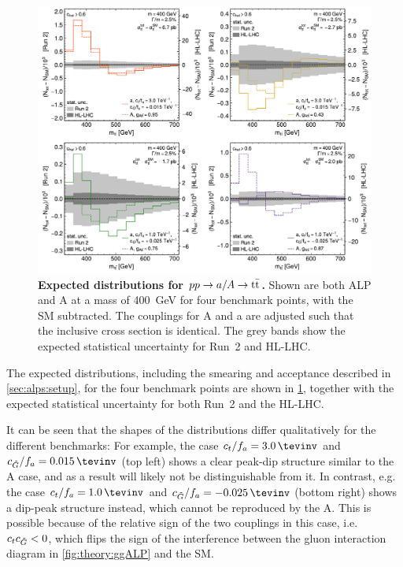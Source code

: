 \begin{figure}[t]
    \centering
    \includegraphics[width=0.99\linewidth]{figures/alps/mttplots.pdf}
    \caption{\textbf{Expected \mtt distributions for $pp \rightarrow a/A \rightarrow \mathrm{t \bar{t}}$.} Shown are both ALP and A at a mass of \SI{400}{\GeV} for four benchmark points, with the SM subtracted. The couplings for A and a are adjusted such that the inclusive cross section is identical. The grey bands show the expected statistical uncertainty for Run~2 and HL-LHC.}
    \label{fig:alps:mttplots}
\end{figure}

The expected \mtt distributions, including the smearing and acceptance described in \cref{sec:alps:setup}, for the four benchmark points are shown in \cref{fig:alps:mttplots}, together with the expected statistical uncertainty for both Run~2 and the HL-LHC. 

It can be seen that the shapes of the distributions differ qualitatively for the different benchmarks: For example, the case $\ct/f_a = \SI{3.0}{\tevinv}$ and $\cG/f_a = \SI{+0.015}{\tevinv}$ (top left) shows a clear peak-dip structure similar to the A case, and as a result will likely not be distinguishable from it. In contrast, e.g. the case $\ct/f_a = \SI{1.0}{\tevinv}$ and $\cG/f_a = \SI{-0.025}{\tevinv}$ (bottom right) shows a dip-peak structure instead, which cannot be reproduced by the A. This is possible because of the relative sign of the two couplings in this case, i.e. $c_t c_{\tilde{G}} < 0$, which flips the sign of the interference between the gluon interaction diagram in \cref{fig:theory:ggALP} and the SM. 

